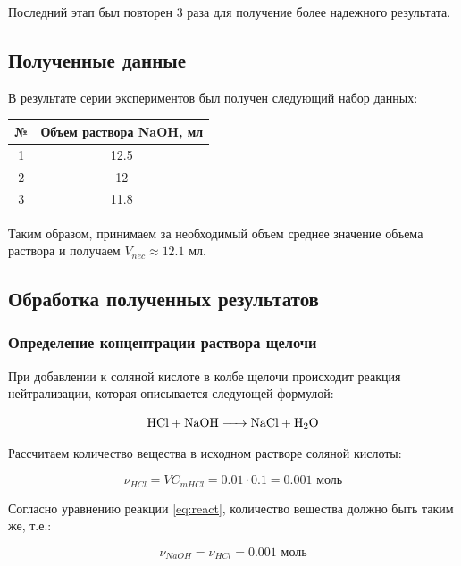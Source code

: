 \documentclass[a4paper, 12pt]{article}
\begin{document}
Последний этап был повторен 3 раза для получение более надежного результата.

\subsection{Полученные данные}

В результате серии экспериментов был получен следующий набор данных:

\begin{center}
	
	\begin{tabular}{|c|c|}
		\hline
		№ & Объем раствора NaOH, мл \\
		\hline
		1 & 12.5 \\
		\hline
		2 & 12 \\
		\hline
		3 & 11.8 \\
		\hline
	\end{tabular}
	
\end{center}

Таким образом, принимаем за необходимый объем среднее значение объема раствора и получаем $V_{nec} \approx 12.1$ мл.

\subsection{Обработка полученных результатов}

\subsubsection{Определение концентрации раствора щелочи}

При добавлении к соляной кислоте в колбе щелочи происходит реакция нейтрализации, которая описывается следующей формулой:

\begin{equation}
\ce{HCl + NaOH -> NaCl + H2O}
\label{eq:react}
\end{equation}

Рассчитаем количество вещества  в исходном растворе соляной кислоты:

\begin{equation}
\nu_{HCl} = V C_{m HCl} = 0.01 \cdot 0.1 = 0.001 \text{ моль}
\end{equation}

Согласно уравнению реакции \ref{eq:react}, количество вещества  должно быть таким же, т.е.:

\begin{equation}
\nu_{NaOH} = \nu_{HCl} = 0.001 \text{ моль}
\end{equation}
\end{document}
